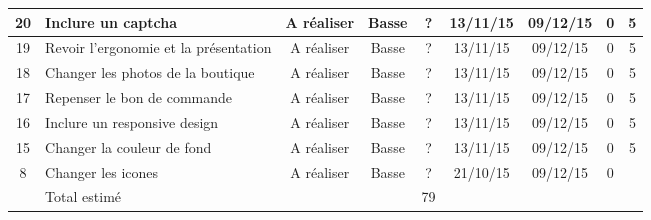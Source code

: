 \begin{tabular}{ | c | p{4cm} | c | c | c | c | c | c | c |  }
20 & Inclure un captcha & A réaliser & Basse & ? & 13/11/15 &
	09/12/15 & 0 & 5 \\ \hline
19 & Revoir l'ergonomie et la présentation & A réaliser & Basse & ? & 13/11/15
	& 09/12/15 & 0 & 5 \\ \hline
18 & Changer les photos de la boutique & A réaliser & Basse & ? & 13/11/15 &
	09/12/15 & 0 & 5 \\ \hline
17 & Repenser le bon de commande & A réaliser & Basse & ? & 13/11/15 & 09/12/15
	& 0 & 5 \\ \hline
16 & Inclure un responsive design & A réaliser & Basse & ? &
	13/11/15 & 09/12/15 & 0 & 5 \\ \hline
15 & Changer la couleur de fond & A réaliser & Basse & ? & 13/11/15 & 09/12/15
	& 0 & 5  \\ \hline
8 & Changer les icones & A réaliser & Basse & ? & 21/10/15 & 09/12/15 & 0 & \\
\hline

 & Total estimé &  &  & 79 &  &  & & \\ \hline
 \end{tabular}